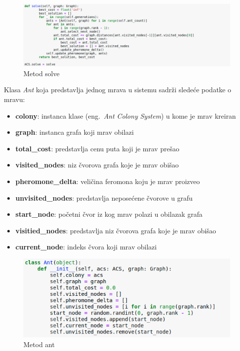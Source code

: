 \documentclass[a4paper]{article}
\begin{document}
\begin{figure}[h!]
\begin{center}
\includegraphics[width=1\columnwidth]{slika4.png}
\end{center}
\caption{Metod solve}
\label{fig:slika4}
\end{figure}

Klasa \textit{Ant} koja predstavlja jednog mrava u sistemu sadrži sledeće podatke o mravu:

\begin{itemize}
\item \textbf{colony}: instanca klase (eng.~{\em Ant Colony System}) u kome je mrav kreiran
\item \textbf{graph}: instanca grafa koji mrav obilazi
\item \textbf{total\_cost}: predstavlja cenu puta koji je mrav prešao
\item \textbf{visited\_nodes}: niz čvorova grafa koje je mrav obišao
\item \textbf{pheromone\_delta}: veličina feromona koju je mrav proizveo
\item \textbf{unvisited\_nodes}: predstavlja neposećene čvorove u grafu
\item \textbf{start\_node}: početni čvor iz kog mrav polazi u obilazak grafa
\item \textbf{visitied\_nodes}: predstavlja niz čvorova grafa koje je mrav obišao
\item \textbf{current\_node}: indeks čvora koji mrav obilazi

\end{itemize}



\begin{figure}[h!]
\begin{center}
\includegraphics[width=1\columnwidth]{slika5.png}
\end{center}
\caption{Metod ant}
\label{fig:slika5}
\end{figure}
\end{document}

